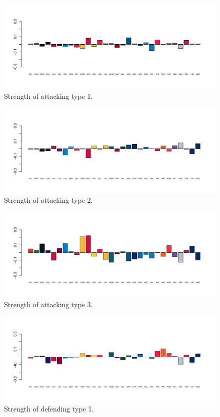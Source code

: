 \begin{figure}[H]
    \centering
    \includegraphics[width=1\textwidth]{Figures/Attack1.pdf}
    \caption[Attack1]{Strength of attacking type 1.}
    \label{fig:Attack1}
\end{figure}

\begin{figure}[H]
    \centering
    \includegraphics[width=1\textwidth]{Figures/Attack2.pdf}
    \caption[Attack2]{Strength of attacking type 2.}
    \label{fig:Attack2}
\end{figure}


\begin{figure}[H]
    \centering
    \includegraphics[width=1\textwidth]{Figures/Attack3.pdf}
    \caption[Attack3]{Strength of attacking type 3.}
    \label{fig:Attack3}
\end{figure}

\begin{figure}[H]
    \centering
    \includegraphics[width=1\textwidth]{Figures/Defence1.pdf}
    \caption[Attack1]{Strength of defending type 1.}
    \label{fig:Defence1}
\end{figure}

